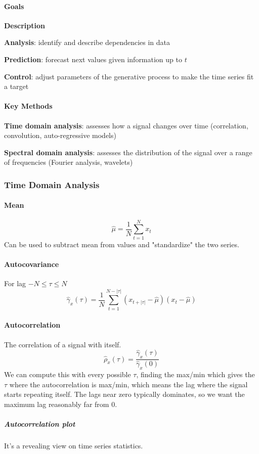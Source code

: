 \documentclass[10pt]{report}
\begin{document}
\paragraph{Goals}\begin{list}{}{}
	\item \textbf{Description}
	\item \textbf{Analysis}: identify and describe dependencies in data
	\item \textbf{Prediction}: forecast next values given information up to $t$
	\item \textbf{Control}: adjust parameters of the generative process to make the time series fit a target
\end{list}
\paragraph{Key Methods}\begin{list}{}{}
	\item \textbf{Time domain analysis}: assesses how a signal changes over time (correlation, convolution, auto-regressive models)
	\item \textbf{Spectral domain analysis}: assesses the distribution of the signal over a range of frequencies (Fourier analysis, wavelets)
\end{list}
\subsubsection{Time Domain Analysis}
\paragraph{Mean} $$\hat\mu=\frac{1}{N}\sum_{t=1}^N x_t$$
Can be used to subtract mean from values and "standardize" the two series.
\paragraph{Autocovariance} For lag $-N\leq \tau \leq N$
$$\hat\gamma_x(\tau) = \frac{1}{N}\sum_{t=1}^{N-|\tau|} (x_{t+|\tau|}-\hat\mu)(x_t - \hat\mu)$$
\paragraph{Autocorrelation} The correlation of a signal with itself. $$\hat\rho_x(\tau)=\frac{\hat\gamma_x(\tau)}{\hat\gamma_x(0)}$$
We can compute this with every possible $\tau$, finding the max/min which gives the $\tau$ where the autocorrelation is max/min, which means the lag where the signal starts repeating itself. The lags near zero typically dominates, so we want the maximum lag reasonably far from 0.
\subparagraph{Autocorrelation plot} It's a revealing view on time series statistics.
\end{document}
